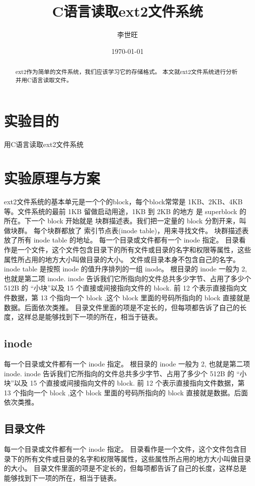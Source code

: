 \documentclass[UTF8]{ctexart}
\title{C语言读取ext2文件系统}
\author{李世旺}
\date{\today}
\begin{document}
\maketitle
\begin{abstract}
ext2作为简单的文件系统，我们应该学习它的存储格式。
本文就ext2文件系统进行分析并用C语言读取文件。
\end{abstract}
\newpage

\tableofcontents

\newpage
\section{实验目的}
用C语言读取ext2文件系统
\section{实验原理与方案}
ext2文件系统的基本单元是一个个的block，每个block常常是 1KB、2KB、4KB等。文件系统的最前 1KB 留做启动用途，1KB 到 2KB 的地方
是 superblock 的所在。下一个 block 开始就是 块群描述表。我们把一定量的 block 分割开来，叫做块群。
每个块群都放了 索引节点表(inode table)，用来寻找文件。
块群描述表 放了所有 inode table 的地址。
每一个目录或文件都有一个 inode 指定。
目录看作是一个文件，这个文件包含目录下的所有文件或目录的名字和权限等属性，这些属性所占用的地方大小叫做目录的大小。
文件或目录本身不包含自己的名字。
inode table 是按照 inode 的值升序排列的一组 inode。
根目录的 inode 一般为 2, 也就是第二项 inode.
inode 告诉我们它所指向的文件总共多少字节、占用了多少个 512B 的 “小块”以及 15 个直接或间接指向文件的 block.
前 12 个表示直接指向文件数据，第 13 个指向一个 block ,这个 block 里面的号码所指向的 block 直接就是数据。后面依次类推。
目录文件里面的项是不定长的，但每项都告诉了自己的长度，这样总是能够找到下一项的所在，相当于链表。
\subsection{inode}
每一个目录或文件都有一个 inode 指定。
根目录的 inode 一般为 2, 也就是第二项 inode.
inode 告诉我们它所指向的文件总共多少字节、占用了多少个 512B 的 “小块”以及 15 个直接或间接指向文件的 block.
前 12 个表示直接指向文件数据，第 13 个指向一个 block ,这个 block 里面的号码所指向的 block 直接就是数据。后面依次类推。
\subsection{目录文件}
每一个目录或文件都有一个 inode 指定。
目录看作是一个文件，这个文件包含目录下的所有文件或目录的名字和权限等属性，这些属性所占用的地方大小叫做目录的大小。
目录文件里面的项是不定长的，但每项都告诉了自己的长度，这样总是能够找到下一项的所在，相当于链表。
\end{document}
